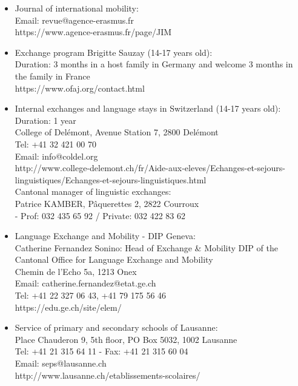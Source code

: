 \begin{itemize}
\vspace{4pt}
\item Journal of international mobility:\\
Email: revue@agence-erasmus.fr \\
https://www.agence-erasmus.fr/page/JIM

\vspace{4pt}
\item Exchange program Brigitte Sauzay (14-17 years old): \\
Duration: 3 months in a host family in Germany and welcome 3 months in the family in France \\
https://www.ofaj.org/contact.html 

\vspace{4pt}
\item Internal exchanges and language stays in Switzerland (14-17 years old): \\
Duration: 1 year \\
College of Delémont, Avenue Station 7, 2800 Delémont \\
Tel: +41 32 421 00 70 \\
Email: info@coldel.org \\
http://www.college-delemont.ch/fr/Aide-aux-eleves/Echanges-et-sejours-linguistiques/Echanges-et-sejours-linguistiques.html \\
Cantonal manager of linguistic exchanges: \\
Patrice KAMBER, Pâquerettes 2, 2822 Courroux \\
- Prof: 032 435 65 92 / Private: 032 422 83 62 

\vspace{4pt}
\item Language Exchange and Mobility - DIP Geneva: \\
Catherine Fernandez Sonino: Head of Exchange \& Mobility DIP of the Cantonal Office for Language Exchange and Mobility \\
Chemin de l'Echo 5a, 1213 Onex \\
Email: catherine.fernandez@etat.ge.ch \\
Tel: +41 22 327 06 43, +41 79 175 56 46 \\
https://edu.ge.ch/site/elem/ 

\vspace{4pt}
\item Service of primary and secondary schools of Lausanne: \\
Place Chauderon 9, 5th floor, PO Box 5032, 1002 Lausanne \\
Tel: +41 21 315 64 11 - Fax: +41 21 315 60 04 \\
Email: seps@lausanne.ch \\
http://www.lausanne.ch/etablissements-scolaires/ 


\end{itemize}
